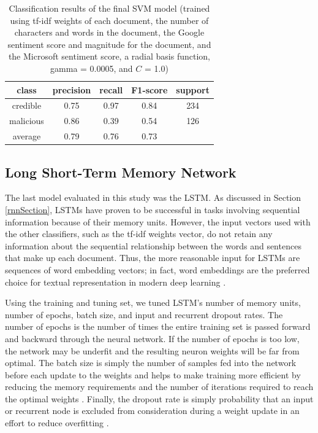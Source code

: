 \begin{table}[h]
\centering
\begin{tabular}{|c | c  c  c | c|}
\hline
class      & precision & recall & F1-score & support\\
\hline
credible   & 0.75      & 0.97   & 0.84     & 234    \\
malicious  & 0.86      & 0.39   & 0.54     & 126    \\
\hline
average    & 0.79      & 0.76   & 0.73     &   \\
\hline
\end{tabular}
\caption[Final SVM's Classification Report]{Classification results of the final SVM model (trained using tf-idf weights of each document, the number of characters and words in the document, the Google sentiment score and magnitude for the document, and the Microsoft sentiment score, a radial basis function, gamma = 0.0005, and $C$ = 1.0)}
\label{table:lastSVM}
\end{table}


\subsection{Long Short-Term Memory Network}

The last model evaluated in this study was the LSTM.  As discussed in Section \ref{rnnSection}, LSTMs have proven to be successful in tasks involving sequential information because of their memory units.  However, the input vectors used with the other classifiers, such as the tf-idf weights vector, do not retain any information about the sequential relationship between the words and sentences that make up each document.  Thus, the more reasonable input for LSTMs are sequences of word embedding vectors; in fact, word embeddings are the preferred choice for textual representation in modern deep learning \cite{wordEmbedding}.

Using the training and tuning set, we tuned LSTM's number of memory units, number of epochs, batch size, and input and recurrent dropout rates.   The number of epochs is the number of times the entire training set is passed forward and backward through the neural network.  If the number of epochs is too low, the network may be underfit and the resulting neuron weights will be far from optimal.  The batch size is simply the number of samples fed into the network before each update to the weights and helps to make training more efficient by reducing the memory requirements and the number of iterations required to reach the optimal weights \cite{batchSize}.  Finally, the dropout rate is simply probability that an input or recurrent node is excluded from consideration during a weight update in an effort to reduce overfitting \cite{dropoutRate}.


